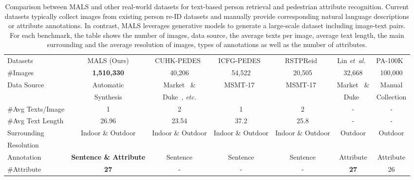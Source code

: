 \documentclass[sigconf]{acmart}
\def\etal{\emph{et~al.}}
\begin{document}
\setlength{\tabcolsep}{5pt}
\vspace{-.2in}
\begin{table*}[t]
\small
\begin{center}
\begin{tabular}{l|c|c|c|c|c|c}
\hline
Datasets & MALS (Ours) & CUHK-PEDES~\cite{li2017person} & ICFG-PEDES~\cite{ding2021semantically} & RSTPReid~\cite{zhu2021dssl} & Lin \etal~\cite{lin2019improving} & PA-100K~\cite{liu2017hydraplus} \\
\shline
\#Images           &  \textbf{1,510,330}  &  40,206  &  54,522  &  20,505  &  32,668  &  100,000  \\

\multirow{2}{*}{Data Source} & Automatic & Market~\cite{Zheng_2015_ICCV} \& & \multirow{2}{*}{MSMT-17~\cite{wei2018person}} & \multirow{2}{*}{MSMT-17~\cite{wei2018person}} & Market~\cite{Zheng_2015_ICCV} \& &  Manual \\
 & Synthesis & Duke~\cite{ristani2016performance}, \emph{etc.} & & & Duke~\cite{ristani2016performance} &  Collection \\
\#Avg Texts/Image  &  1  &  2  &  1  &  2  &  -  &  -  \\
\#Avg Text Length  &  26.96  &  23.54  &  37.2  &  25.8  &  -  &  -   \\ 
Surrounding        &  Indoor \& Outdoor  &  Indoor \& Outdoor  &  Indoor \& Outdoor  &  Indoor \& Outdoor  &  Outdoor  &  Outdoor  \\
Resolution         &    &    &    &    &    &    \\
Annotation         &  \textbf{Sentence \& Attribute}  &  Sentence  &  Sentence  &  Sentence  &  Attribute  &  Attribute  \\
\#Attribute        &  \textbf{27}  &  -  &  -  &  -  &  \textbf{27}  &  26  \\
\hline
\end{tabular}
\end{center}
\caption{Comparison between MALS and other real-world datasets for text-based person retrieval and pedestrian attribute recognition. Current datasets typically collect images from existing person re-ID datasets and manually provide corresponding natural language descriptions or attribute annotations. In contrast, MALS leverages generative models to generate a large-scale dataset including  image-text pairs.
For each benchmark, the table shows the number of images, data source, the average texts per image, average text length, the main surrounding and the average resolution of images, types of annotations as well as the number of attributes.
}
\label{table:Dataset}
\vspace{-.3in}
\end{table*}
\end{document}
